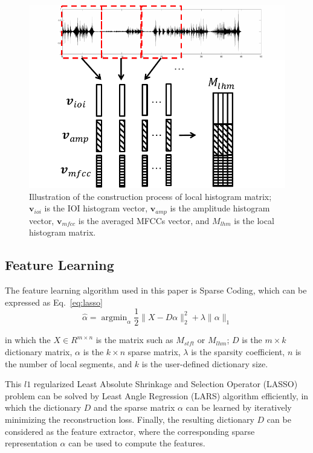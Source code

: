 \documentclass{article}
\begin{document}
\begin{figure}
\centering
\includegraphics[width = 8 cm]{./figs/hist_mat.pdf}
\caption{Illustration of the construction process of local histogram matrix; $\mathbf{v}_{ioi}$ is the IOI histogram vector, $\mathbf{v}_{amp}$ is the amplitude histogram vector, $\mathbf{v}_{mfcc}$ is the averaged MFCCs vector, and $M_{lhm}$ is the local histogram matrix.}
\label{fig:hist_mat}
\end{figure}

\subsection{Feature Learning}\label{subsec:feat_learn}
The feature learning algorithm used in this paper is Sparse Coding, which can be expressed as Eq.~\ref{eq:lasso}
\begin{equation}\label{eq:lasso}
\hat{\alpha} = \mathop{\mathrm{argmin}}_\alpha \frac{1}{2} \| X - D\alpha \|_{2}^{2} + \lambda \| \alpha \|_{1}
\end{equation}

in which the $X \in R^{ m \times n}$ is the matrix  such as $M_{stft}$ or $M_{lhm}$; $D$ is the $m \times k$ dictionary matrix, $\alpha$ is the $k \times n$ sparse matrix, $\lambda$ is the sparsity coefficient, $n$ is the number of local segments, and $k$ is the user-defined dictionary size. 

This $l1$ regularized Least Absolute Shrinkage and Selection Operator (LASSO) problem can be solved by Least Angle Regression (LARS)\cite{Efron2004} algorithm efficiently, in which the dictionary $D$ and the sparse matrix $\alpha$ can be learned by iteratively minimizing the reconstruction loss. Finally, the resulting dictionary $D$ can be considered as the feature extractor, where the corresponding sparse representation $\alpha$ can be used to compute the features. 
\end{document}
